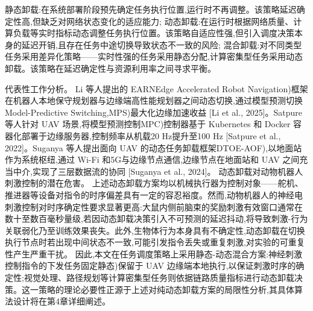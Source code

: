 静态卸载:在系统部署阶段预先确定任务执行位置,运行时不再调整。该策略延迟确定性高,但缺乏对网络状态变化的适应能力;
动态卸载:在运行时根据网络质量、计算负载等实时指标动态调整任务执行位置。该策略自适应性强,但引入调度决策本身的延迟开销,且存在任务中途切换导致状态不一致的风险;
混合卸载:对不同类型任务采用差异化策略——实时性强的任务采用静态分配,计算密集型任务采用动态卸载。该策略在延迟确定性与资源利用率之间寻求平衡。

代表性工作分析。 Li 等人提出的 EARNEdge Accelerated Robot Navigation)框架在机器人本地保守规划器与边缘端高性能规划器之间动态切换,通过模型预测切换Model-Predictive Switching,MPS)最大化边缘加速收益 [Li et al., 2025]。Satpure 等人针对 UAV 场景,将模型预测控制MPC)控制器基于 Kubernetes 和 Docker 容器化部署于边缘服务器,控制频率从机载20 Hz提升至100 Hz [Satpure et al., 2022]。Suganya 等人提出面向 UAV 的动态任务卸载框架DTOE-AOF),以地面站作为系统枢纽,通过 Wi-Fi 和5G与边缘节点通信,边缘节点在地面站和 UAV 之间充当中介,实现了三层数据流的协同 [Suganya et al., 2024]。
动态卸载对动物机器人刺激控制的潜在危害。 上述动态卸载方案均以机械执行器为控制对象——舵机、推进器等设备对指令的时序偏差具有一定的容忍裕度。然而,动物机器人的神经电刺激控制对时序确定性要求显著更高:大鼠内侧前脑束的奖励刺激有效窗口通常在数十至数百毫秒量级,若因动态卸载决策引入不可预测的延迟抖动,将导致刺激-行为关联弱化乃至训练效果丧失。此外,生物体行为本身具有不确定性,动态卸载在切换执行节点时若出现中间状态不一致,可能引发指令丢失或重复刺激,对实验的可重复性产生严重干扰。
因此,本文在任务调度策略上采用静态-动态混合方案:神经刺激控制指令的下发任务固定静态)保留于 UAV 边缘端本地执行,以保证刺激时序的确定性;视觉处理、路径规划等计算密集型任务则依据链路质量指标进行动态卸载决策。这一策略的理论必要性正源于上述对纯动态卸载方案的局限性分析,其具体算法设计将在第4章详细阐述。
